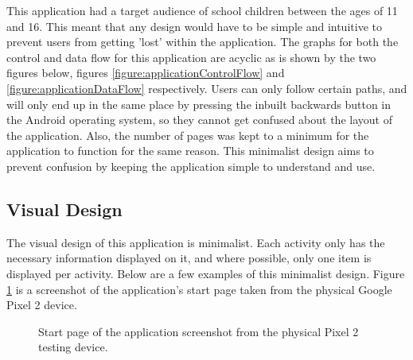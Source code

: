 \documentclass{article}
\begin{document}
This application had a target audience of school children between the ages of 11 and 16. This meant that any design would have to be simple and intuitive to prevent users from getting 'lost' within the application. The graphs for both the control and data flow for this application are acyclic as is shown by the two figures below, figures \ref{figure:applicationControlFlow} and \ref{figure:applicationDataFlow} respectively. Users can only follow certain paths, and will only end up in the same place by pressing the inbuilt backwards button in the Android operating system, so they cannot get confused about the layout of the application. Also, the number of pages was kept to a minimum for the application to function for the same reason. This minimalist design aims to prevent confusion by keeping the application simple to understand and use. \par

\subsection{Visual Design}

The visual design of this application is minimalist. Each activity only has the necessary information displayed on it, and where possible, only one item is displayed per activity. Below are a few examples of this minimalist design. Figure \ref{figure:applicationStartPage} is a screenshot of the application's start page taken from the physical Google Pixel 2 device.

\begin{figure}[H]
	\centering
	\caption{Start page of the application screenshot from the physical Pixel 2 testing device.}
	\label{figure:applicationStartPage}
\end{figure}
\end{document}
